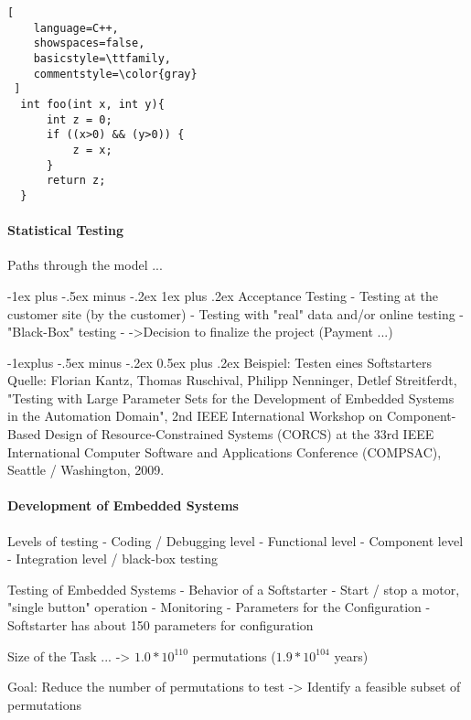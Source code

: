 \documentclass[a4paper]{article}
\makeatletter
\renewcommand{\subsection}{\@startsection{subsection}{2}{0mm}%
                                {-1explus -.5ex minus -.2ex}%
                                {0.5ex plus .2ex}%
                                {\normalfont\normalsize\bfseries}}
\renewcommand{\subsubsection}{\@startsection{subsubsection}{3}{0mm}%
                                {-1ex plus -.5ex minus -.2ex}%
                                {1ex plus .2ex}%
                                {\normalfont\small\bfseries}}
\makeatother
\begin{document}
\begin{multicols}{3}
  
  \begin{lstlisting}[
    language=C++,
    showspaces=false,
    basicstyle=\ttfamily,
    commentstyle=\color{gray}
 ]
  int foo(int x, int y){
      int z = 0;
      if ((x>0) && (y>0)) {
          z = x;
      }
      return z;
  }
  \end{lstlisting}
  
  \paragraph{Statistical Testing}
  Paths through the model ...
  
  \subsubsection{Acceptance Testing}
  - Testing at the customer site (by the customer)
  - Testing with "real" data and/or online testing
  - "Black-Box" testing
  - ->Decision to finalize the project (Payment ...)
  
  \subsection{Beispiel: Testen eines Softstarters}
  Quelle: Florian Kantz, Thomas Ruschival, Philipp Nenninger, Detlef Streitferdt, "Testing with Large Parameter Sets for the Development of Embedded Systems in the Automation Domain", 2nd IEEE International Workshop on Component-Based Design of Resource-Constrained Systems (CORCS) at the 33rd IEEE International Computer Software and
   Applications Conference (COMPSAC), Seattle / Washington, 2009.
  
  \paragraph{Development of Embedded Systems}
  Levels of testing
  - Coding / Debugging level
  - Functional level
  - Component level
  - Integration level / black-box testing
  
  Testing of Embedded Systems
  - Behavior of a Softstarter
      - Start / stop a motor, "single button" operation
      - Monitoring
  - Parameters for the Configuration
      - Softstarter has about 150 parameters for configuration
  
  Size of the Task ...
  -> $1.0 * 10^{110}$ permutations ($1.9*10^104$ years)
  
  Goal: Reduce the number of permutations to test -> Identify a feasible subset of permutations
  

\end{multicols}
\end{document}
